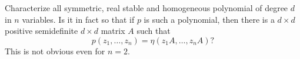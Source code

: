Characterize all symmetric, real stable and homogeneous polynomial of degree $d$ in $n$ variables.  Is it in fact so that if $p$ is such a polynomial, then there is a $d\times d$ positive semidefinite $d\times d$ matrix $A$ such that
\[p(z_1,\ldots,z_n)=\eta(z_1A,\ldots,z_nA)?\]
This is not obvious even for $n=2$.
